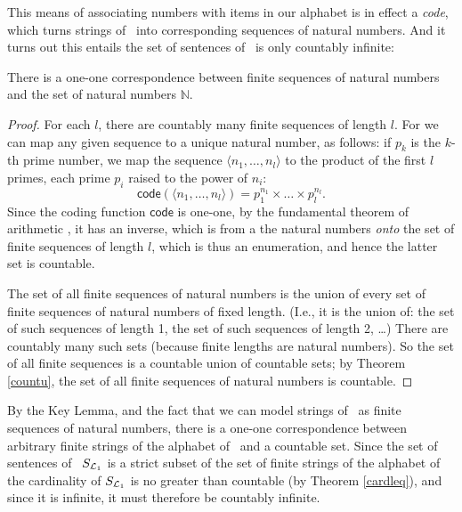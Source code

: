 This means of associating numbers with items in our alphabet is in effect a \emph{code}, which turns strings of \lone\ into corresponding sequences of natural numbers. And it turns out this entails the set of sentences of \lone\ is only countably infinite:
 \begin{lemma}\label{keylemma}
	There is a one-one correspondence between finite sequences of natural numbers and the set of natural numbers $\mathbb{N}$.
	\begin{proof}
		For each $l$, there are countably many finite sequences of length $l$. For we can map any given sequence to a unique natural number, as follows: if $p_{k}$ is the $k$-th prime number, we map the sequence  $\langle n_{1}, \ldots, n_{l}\rangle$ to the product of the first $l$ primes, each prime $p_{i}$ raised to the power of $n_{i}$: $$\mathsf{code}(\langle n_{1}, \ldots, n_{l}\rangle) = p_{1}^{n_{1}}\times\ldots\times p_{l}^{n_{l}}.$$ Since the coding function $\mathsf{code}$ is one-one, by the fundamental theorem of arithmetic \citep[§V.14]{fundta}, it has an inverse, which is from a the natural numbers \emph{onto} the set of finite sequences of length $l$, which is thus an enumeration, and hence the latter set is countable.
		
		The set of all finite sequences of natural numbers is the union of every set of finite sequences of natural numbers of fixed length. (I.e., it is the union of: the set of such sequences of length 1, the set of such sequences of length 2, …) There are countably many such sets (because finite lengths are natural numbers). So the set of all finite sequences is a countable union of countable sets; by Theorem \ref{countu}, the set of all finite sequences of natural numbers is countable. 
	\end{proof}
\end{lemma}  
By the Key Lemma, and the fact that we can model strings of \lone\ as finite sequences of natural numbers, there is a one-one correspondence between arbitrary  finite strings of the alphabet of \lone\ and a countable set. Since the set of sentences of \lone\ $S_{\mathcal{L}_{1}}$ is a strict subset of the set of finite strings of the alphabet of \lone\, the cardinality of $S_{\mathcal{L}_{1}}$ is no greater than countable (by Theorem \ref{cardleq}), and since it is infinite, it must therefore be countably infinite. 

